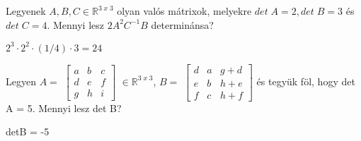 \begin{frame}
  \begin{tcolorbox}[title={7/5. {\symknight}}]
    Legyenek $A,B,C \in \mathbb{R}^{3 \; x \; 3}$ olyan valós mátrixok, melyekre $det \; A = 2, det \; B = 3$ és $det \; C = 4$. Mennyi lesz $2A^2C^{-1}B$ determinánsa?
  \tcblower

    \mmedskip 
    
     $2^3  \cdot 2^2  \cdot (1/4) \cdot 3 = 24$
  \end{tcolorbox}
\end{frame}

\begin{frame}
  \begin{tcolorbox}[title={7/6. {\symrook}}]
    Legyen $A =$ $\begin{bmatrix} 
  				a & b & c \\
  				d & e & f \\
  				g & h & i
			\end{bmatrix}$ $\in \mathbb{R}^{3 \; x \; 3}$, $B = $ $\begin{bmatrix} 
  				d & a & g + d \\
  				e & b & h + e \\
  				f & c & h + f
			\end{bmatrix}$ és tegyük föl, hogy det A = 5. Mennyi lesz det B?
  \tcblower

    \mmedskip 
    
     detB = -5
  \end{tcolorbox}
\end{frame}


